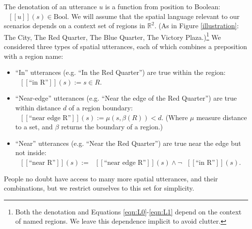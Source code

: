 \documentclass[10pt,letterpaper]{article}
\newcommand{\denote}[1]{\mbox{ $[\![ #1 ]\!]$}}
\begin{document}
The denotation of an utterance $u$ is a function from position to Boolean: $\denote{u}(s)\in \text{Bool}$.
We will assume that the spatial language relevant to our scenarios depends on a context set of regions in $\mathbb{R}^2$.
(As in Figure \ref{illustration}: The City, The Red Quarter, The Blue Quarter, The Victory Plaza.)\footnote{Both the denotation and Equations \ref{eqn:L0}-\ref{eqn:L1} depend on the context of named regions. We leave this dependence implicit to avoid clutter.}
We considered three types of spatial utterances, each of which combines a preposition with a region name: 
\begin{itemize}
\item ``In'' utterances (e.g. ``In the Red Quarter'') are true within the region: $\denote{\text{``in R''}}(s) := s\in R$.
\item ``Near-edge'' utterances (e.g. ``Near the edge of the Red Quarter'') are true within distance $d$ of a region boundary: $\denote{\text{``near edge R''}}(s) := \mu(s,\beta(R))<d$. (Where $\mu$ measure distance to a set, and $\beta$ returns the boundary of a region.)
\item ``Near'' utterances (e.g. ``Near the Red Quarter'') are true near the edge but not inside: $\denote{\text{``near R''}}(s) := 
\denote{\text{``near edge R''}}(s) \wedge \neg \denote{\text{``in R''}}(s)$.
\end{itemize}
People no doubt have access to many more spatial utterances, and their combinations, but we restrict ourselves to this set for simplicity. 





\end{document}
